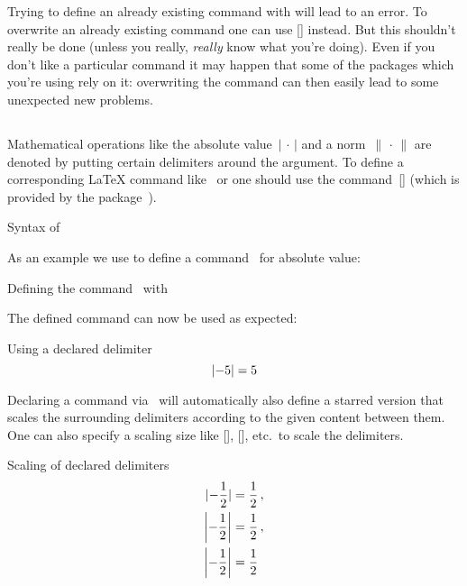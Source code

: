 Trying to define an already existing command with  will lead to an error.
To overwrite an already existing command one can use [\comname] instead.
But this shouldn’t really be done (unless you really, \emph{really} know what you’re doing).
Even if you don’t like a particular command it may happen that some of the packages which you’re using rely on it:
overwriting the command can then easily lead to some unexpected new problems.



\subsection{}

Mathematical operations like the absolute value~$\lvert \,\cdot\, \rvert$ and a norm~$\lVert \,\cdot\, \rVert$ are denoted by putting certain delimiters around the argument.
To define a corresponding {\LaTeX} command like~ or  one should use the command~[\comname] (which is provided by the package~).
\begin{showcode}{Syntax of }
\end{showcode}
As an example we use  to define a command~ for absolute value:
\begin{showcode}{Defining the command~ with }
\DeclarePairedDelimiter{\abs}{\lvert}{\rvert}
\end{showcode}
The defined command can now be used as expected:
\begin{showlatex}{Using a declared delimiter}
  \[
    \abs{-5} = 5
  \]
\end{showlatex}

Declaring a command via~ will automatically also define a starred version that scales the surrounding delimiters according to the given content between them.
One can also specify a scaling size like [\comname], [\comname], etc.\ to scale the delimiters.
\begin{showlatex}{Scaling of declared delimiters}
\begin{align*}
  \abs{-\frac{1}{2}}
  &=
  \frac{1}{2} \,,
  \\
  \abs*{-\frac{1}{2}}
  &=
  \frac{1}{2} \,,
  \\
  \abs[\bigg]{-\frac{1}{2}}
  &=
  \frac{1}{2}
\end{align*}
\end{showlatex}

